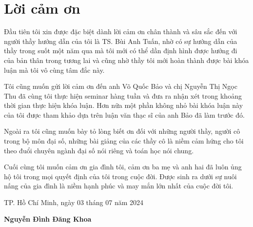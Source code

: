 \chapter*{Lời cảm ơn}

Đầu tiên tôi xin được đặc biệt dành lời cảm ơn chân thành và sâu sắc đến với người thầy hướng dẫn của tôi là TS. Bùi Anh Tuấn, nhờ có sự hướng dẫn của thầy trong suốt một năm qua mà tôi mới có thể dần định hình được hướng đi của bản thân trong tương lai và cũng nhờ thầy tôi mới hoàn thành được bài khóa luận mà tôi vô cùng tâm đắc này.

Tôi cũng muốn gửi lời cảm ơn đến anh Võ Quốc Bảo và chị Nguyễn Thị Ngọc Thu đã cùng tôi thực hiện seminar hàng tuần và đưa ra nhận xét trong khoảng thời gian thực hiện khóa luận. Hơn nữa một phần không nhỏ bài khóa luận này của tôi được tham khảo dựa trên luận văn thạc sĩ của anh Bảo đã làm trước đó.

Ngoài ra tôi cũng muốn bày tỏ lòng biết ơn đối với những người thầy, người cô trong bộ môn đại số, những bài giảng của các thầy cô là niềm cảm hứng cho tôi theo đuổi chuyên ngành đại số nói riêng và toán học nói chung.

Cuối cùng tôi muốn cảm ơn gia đình tôi, cảm ơn ba mẹ và anh hai đã luôn ủng hộ tôi trong mọi quyết định của tôi trong cuộc đời. Được sinh ra dưới sự nuôi nấng của gia đình là niềm hạnh phúc và may mắn lớn nhất của cuộc đời tôi.
\vspace{2cm}
\begin{flushright}
    \begin{varwidth}{\linewidth}\centering

        TP. Hồ Chí Minh, ngày 03 tháng 07 năm 2024
        \vspace{0.3cm}

        \textbf{Nguyễn Đình Đăng Khoa}
    \end{varwidth}
\end{flushright}
